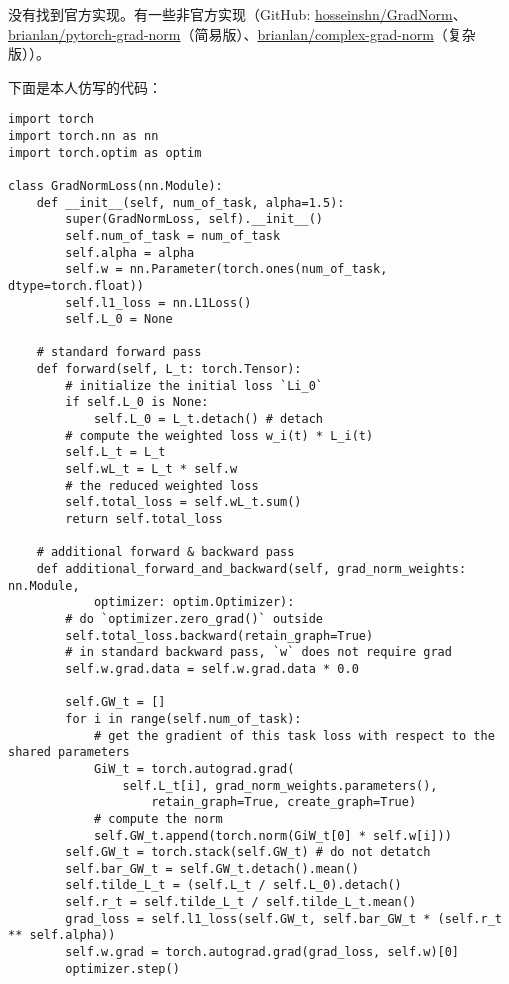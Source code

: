 \documentclass{ctexart}
\begin{document}
\subsubsection{}

没有找到官方实现。有一些非官方实现（GitHub: \href{https://github.com/hosseinshn/GradNorm}{hosseinshn/GradNorm}、\href{https://github.com/brianlan/pytorch-grad-norm}{brianlan/pytorch-grad-norm}（简易版）、\href{https://github.com/brianlan/complex-grad-norm}{brianlan/complex-grad-norm}（复杂版））。

下面是本人仿写的代码：
\begin{verbatim}
import torch
import torch.nn as nn
import torch.optim as optim

class GradNormLoss(nn.Module):
    def __init__(self, num_of_task, alpha=1.5):
        super(GradNormLoss, self).__init__()
        self.num_of_task = num_of_task
        self.alpha = alpha
        self.w = nn.Parameter(torch.ones(num_of_task, dtype=torch.float))
        self.l1_loss = nn.L1Loss()
        self.L_0 = None

    # standard forward pass
    def forward(self, L_t: torch.Tensor):
        # initialize the initial loss `Li_0`
        if self.L_0 is None:
            self.L_0 = L_t.detach() # detach
        # compute the weighted loss w_i(t) * L_i(t)
        self.L_t = L_t
        self.wL_t = L_t * self.w
        # the reduced weighted loss
        self.total_loss = self.wL_t.sum()
        return self.total_loss

    # additional forward & backward pass
    def additional_forward_and_backward(self, grad_norm_weights: nn.Module, 
            optimizer: optim.Optimizer):
        # do `optimizer.zero_grad()` outside
        self.total_loss.backward(retain_graph=True)
        # in standard backward pass, `w` does not require grad
        self.w.grad.data = self.w.grad.data * 0.0

        self.GW_t = []
        for i in range(self.num_of_task):
            # get the gradient of this task loss with respect to the shared parameters
            GiW_t = torch.autograd.grad(
                self.L_t[i], grad_norm_weights.parameters(),
                    retain_graph=True, create_graph=True)
            # compute the norm
            self.GW_t.append(torch.norm(GiW_t[0] * self.w[i]))
        self.GW_t = torch.stack(self.GW_t) # do not detatch
        self.bar_GW_t = self.GW_t.detach().mean()
        self.tilde_L_t = (self.L_t / self.L_0).detach()
        self.r_t = self.tilde_L_t / self.tilde_L_t.mean()
        grad_loss = self.l1_loss(self.GW_t, self.bar_GW_t * (self.r_t ** self.alpha))
        self.w.grad = torch.autograd.grad(grad_loss, self.w)[0]
        optimizer.step()


\end{verbatim}
\end{document}
